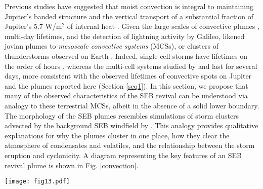 \documentclass[final,authoryear,5p,times,twocolumn]{elsarticle}
\begin{document}
Previous studies have suggested that moist convection is integral to maintaining Jupiter's banded structure \citep[e.g.,][]{70barcilon, 00ingersoll, 02hueso, 04ingersoll, 05showman, 14sugiyama, 16thomson} and the vertical transport of a substantial fraction of Jupiter's 5.7 W/m$^2$ of internal heat \citep{00gierasch}.  Given the large scales of convective plumes \citep[1000-5000 km,][]{00gierasch, 02hueso}, multi-day lifetimes, and the detection of lightning activity by Galileo, \citet{00gierasch} likened jovian plumes to \textit{mesoscale convective systems} (MCSs), or clusters of thunderstorms observed on Earth \citep[see detailed reviews in][]{93houze,04houze,06wallace,15thomson_phd}.  Indeed, single-cell storms have lifetimes on the order of hours \citep{01hueso}, whereas the multi-cell systems studied by \citet{02hueso} and \citet{14sugiyama} last for several days, more consistent with the observed lifetimes of convective spots on Jupiter \citep{04li} and the plumes reported here (Section \ref{seq1}).  In this section, we propose that many of the observed characteristics of the SEB revival can be understood via analogy to these terrestrial MCSs, albeit in the absence of a solid lower boundary.  The morphology of the SEB plumes resembles simulations of storm clusters advected by the background SEB windfield by \citet{02hueso}.  This analogy provides qualitative explanations for why the plumes cluster in one place, how they clear the atmosphere of condensates and volatiles, and the relationship between the storm eruption and cyclonicity.  A diagram representing the key features of an SEB revival plume is shown in Fig. \ref{convection}.  

\begin{figure*}
\begin{centering}
\centerline{\texttt{[image: fig13.pdf]}}
\caption{Diagram representing motions associated with a moist convective plume on Jupiter, following \citet{02hueso, 04houze, 16thomson}.  Latitudes increase from left to right, from the equator to the southern hemisphere.  The LCL (lifting condensation layer), LFC (level of free convection), LNB (level of neutral buoyancy) and CIN (convective inhibition layer) are all noted, as well as approximate altitudes for the three primary cloud decks.  Horizontal cyclonic and anticyclonic motions in mesoscale vortices, and vertical upwelling and subsidence creating plumes and lanes, are represented by arrows on the diagram.  All locations are approximate and the diagram is not to scale. }
\label{convection}
\end{centering}
\end{figure*}
\end{document}
